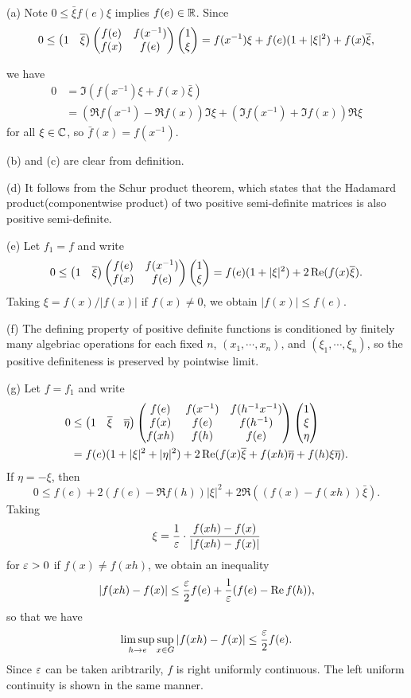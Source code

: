 \documentclass[10pt]{article}
\begin{document}
\begin{pf}
(a)
Note $0\le\bar\xi f(e)\xi$ implies $f(e)\in\mathbb{R}$.
Since
\[0\le\begin{pmatrix}1&\overline\xi\end{pmatrix}\begin{pmatrix}f(e)&f(x^{-1})\\f(x)&f(e)\end{pmatrix}\begin{pmatrix}1\\\xi\end{pmatrix}=f(x^{-1})\xi+f(e)(1+|\xi|^2)+f(x)\overline\xi,\]

we have
\begin{align*}
0&=\Im(f(x^{-1})\xi+f(x)\bar\xi)\\
&=(\Re f(x^{-1})-\Re f(x))\Im\xi+(\Im f(x^{-1})+\Im f(x))\Re\xi
\end{align*}
for all $\xi\in\mathbb{C}$, so $\bar f(x)=f(x^{-1})$.

(b) and (c) are clear from definition.

(d) It follows from the Schur product theorem, which states that the Hadamard product(componentwise product) of two positive semi-definite matrices is also positive semi-definite.

(e)
Let $f_1=f$ and write
\[0\le\begin{pmatrix}1&\overline\xi\end{pmatrix}\begin{pmatrix}f(e)&f(x^{-1})\\f(x)&f(e)\end{pmatrix}\begin{pmatrix}1\\\xi\end{pmatrix}=f(e)(1+|\xi|^2)+2\operatorname{Re}(f(x)\overline\xi).\]
Taking $\xi=f(x)/|f(x)|$ if $f(x)\ne0$, we obtain $|f(x)|\le f(e)$.

(f)
The defining property of positive definite functions is conditioned by finitely many algebriac operations for each fixed $n$, $(x_1,\cdots,x_n)$, and $(\xi_1,\cdots,\xi_n)$, so the positive definiteness is preserved by pointwise limit.

(g)
Let $f=f_1$ and write
\begin{align*}
0&\le\begin{pmatrix}1&\overline\xi&\overline\eta\end{pmatrix}\begin{pmatrix}f(e)&f(x^{-1})&f(h^{-1}x^{-1})\\f(x)&f(e)&f(h^{-1})\\f(xh)&f(h)&f(e)\end{pmatrix}\begin{pmatrix}1\\\xi\\\eta\end{pmatrix}\\
&=f(e)(1+|\xi|^2+|\eta|^2)+2\operatorname{Re}(f(x)\overline\xi+f(xh)\overline\eta+f(h)\xi\overline\eta).
\end{align*}
If $\eta=-\xi$, then
\[0\le f(e)+2(f(e)-\Re f(h))|\xi|^2+2\Re((f(x)-f(xh))\bar\xi).\]
Taking
\[\xi=\frac1{\varepsilon}\cdot\frac{f(xh)-f(x)}{|f(xh)-f(x)|}\]
for $\varepsilon>0$ if $f(x)\ne f(xh)$, we obtain an inequality
\[|f(xh)-f(x)|\le\frac{\varepsilon}2f(e)+\frac1{\varepsilon}(f(e)-\operatorname{Re} f(h)),\]
so that we have
\[\limsup_{h\to e}\sup_{x\in G}|f(xh)-f(x)|\le\frac{\varepsilon}2f(e).\]
Since $\varepsilon$ can be taken aribtrarily, $f$ is right uniformly continuous.
The left uniform continuity is shown in the same manner.
\end{pf}
\end{document}
